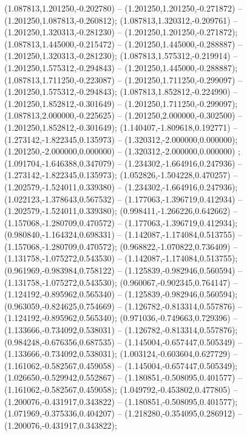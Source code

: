  (1.087813,1.201250,-0.202780) -- (1.201250,1.201250,-0.271872) -- (1.201250,1.087813,-0.260812);
 (1.087813,1.320312,-0.209761) -- (1.201250,1.320313,-0.281230) -- (1.201250,1.201250,-0.271872);
 (1.087813,1.445000,-0.215472) -- (1.201250,1.445000,-0.288887) -- (1.201250,1.320313,-0.281230);
 (1.087813,1.575312,-0.219914) -- (1.201250,1.575312,-0.294843) -- (1.201250,1.445000,-0.288887);
 (1.087813,1.711250,-0.223087) -- (1.201250,1.711250,-0.299097) -- (1.201250,1.575312,-0.294843);
 (1.087813,1.852812,-0.224990) -- (1.201250,1.852812,-0.301649) -- (1.201250,1.711250,-0.299097);
 (1.087813,2.000000,-0.225625) -- (1.201250,2.000000,-0.302500) -- (1.201250,1.852812,-0.301649);
 (1.140407,-1.809618,0.192771) -- (1.273142,-1.822345,0.135973) -- (1.320312,-2.000000,0.000000);
 (1.201250,-2.000000,0.000000) -- (1.320312,-2.000000,0.000000) ;
 (1.091704,-1.646388,0.347079) -- (1.234302,-1.664916,0.247936) -- (1.273142,-1.822345,0.135973);
 (1.052826,-1.504228,0.470257) -- (1.202579,-1.524011,0.339380) -- (1.234302,-1.664916,0.247936);
 (1.022123,-1.378643,0.567532) -- (1.177063,-1.396719,0.412934) -- (1.202579,-1.524011,0.339380);
 (0.998411,-1.266226,0.642662) -- (1.157068,-1.280709,0.470572) -- (1.177063,-1.396719,0.412934);
 (0.980840,-1.164324,0.698331) -- (1.142087,-1.174084,0.513755) -- (1.157068,-1.280709,0.470572);
 (0.968822,-1.070822,0.736409) -- (1.131758,-1.075272,0.543530) -- (1.142087,-1.174084,0.513755);
 (0.961969,-0.983984,0.758122) -- (1.125839,-0.982946,0.560594) -- (1.131758,-1.075272,0.543530);
 (0.960067,-0.902345,0.764147) -- (1.124192,-0.895962,0.565340) -- (1.125839,-0.982946,0.560594);
 (0.963059,-0.824625,0.754669) -- (1.126782,-0.813314,0.557876) -- (1.124192,-0.895962,0.565340);
 (0.971036,-0.749663,0.729396) -- (1.133666,-0.734092,0.538031) -- (1.126782,-0.813314,0.557876);
 (0.984248,-0.676356,0.687535) -- (1.145004,-0.657447,0.505349) -- (1.133666,-0.734092,0.538031);
 (1.003124,-0.603604,0.627729) -- (1.161062,-0.582567,0.459058) -- (1.145004,-0.657447,0.505349);
 (1.026650,-0.529942,0.552867) -- (1.180851,-0.508095,0.401577) -- (1.161062,-0.582567,0.459058);
 (1.049792,-0.453802,0.477805) -- (1.200076,-0.431917,0.343822) -- (1.180851,-0.508095,0.401577);
 (1.071969,-0.375336,0.404207) -- (1.218280,-0.354095,0.286912) -- (1.200076,-0.431917,0.343822);
